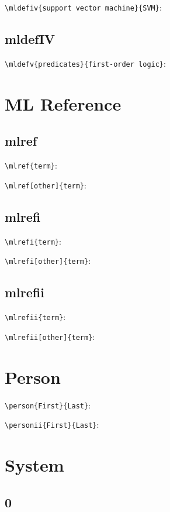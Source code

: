 \documentclass{article}
\begin{document}
\verb|\mldefiv{support vector machine}{SVM}|:
 \

\subsection{mldefIV}

\verb|\mldefv{predicates}{first-order logic}|:
 \

\section{ML Reference}

\subsection{mlref}

\verb|\mlref{term}|:

\verb|\mlref[other]{term}|:

\subsection{mlrefi}

\verb|\mlrefi{term}|:

\verb|\mlrefi[other]{term}|:

\subsection{mlrefii}

\verb|\mlrefii{term}|:

\verb|\mlrefii[other]{term}|:

\section{Person}

\verb|\person{First}{Last}|:

\verb|\personii{First}{Last}|:

\section{System}

\subsection{0}
\end{document}
